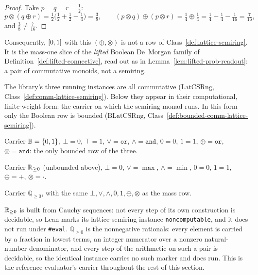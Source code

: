 \begin{proof}
\leanok
Take $p=q=r=\tfrac12$:
\[
  p \otimes (q \oplus r) = \tfrac12\bigl(\tfrac12+\tfrac12-\tfrac14\bigr)
    = \tfrac38,
  \qquad
  (p\otimes q) \oplus (p \otimes r)
    = \tfrac14 \oplus \tfrac14
    = \tfrac14+\tfrac14-\tfrac1{16} = \tfrac{7}{16},
\]
and $\tfrac38 \ne \tfrac{7}{16}$.
\end{proof}

Consequently, $[0,1]$ with this $(\oplus,\otimes)$ is not a row of
Class~\ref{def:lattice-semiring}. It is the mass-one slice of the
\emph{lifted} Boolean De~Morgan family of
Definition~\ref{def:lifted-connective}, read out as in
Lemma~\ref{lem:lifted-prob-readout}: a pair of commutative monoids,
not a semiring.

The library's three running instances are all commutative
($\mathrm{LatCSRng}$, Class~\ref{def:comm-lattice-semiring}). Below
they appear in their computational, finite-weight form: the carrier on
which the semiring monad runs. In this form only the Boolean row is
bounded ($\mathrm{BLatCSRng}$, Class~\ref{def:bounded-comm-lattice-semiring}).

\begin{instance}
\label{inst:boolw-latcsrng}
\leanok
Carrier $\mathbb B = \{0,1\}$, $\bot{=}0$, $\top{=}1$,
$\vee{=}\mathtt{or}$, $\wedge{=}\mathtt{and}$, $0{=}0$, $1{=}1$,
$\oplus{=}\mathtt{or}$, $\otimes{=}\mathtt{and}$: the only bounded
row of the three.
\end{instance}

\begin{instance}
\label{inst:massS-latcsrng}
\leanok
Carrier $\mathbb R_{\ge 0}$ (unbounded above), $\bot{=}0$, $\vee{=}\max$,
$\wedge{=}\min$, $0{=}0$, $1{=}1$, $\oplus{=}{+}$, $\otimes{=}\cdot$.
\end{instance}

\begin{instance}
\label{inst:qmass-latcsrng}
\leanok
Carrier $\mathbb Q_{\ge 0}$, with the same
$\bot,\vee,\wedge,0,1,\oplus,\otimes$ as the mass row.
\end{instance}

$\mathbb R_{\ge 0}$ is built from Cauchy sequences: not every step of its own
construction is decidable, so Lean marks its lattice-semiring instance
\texttt{noncomputable}, and it does not run under \texttt{\#eval}.
$\mathbb Q_{\ge 0}$ is the nonnegative rationals: every element is
carried by a fraction in lowest terms, an integer numerator over a
nonzero natural-number denominator, and every step of the arithmetic
on such a pair is decidable, so the identical instance carries no such
marker and does run. This is the reference evaluator's carrier
throughout the rest of this section.

